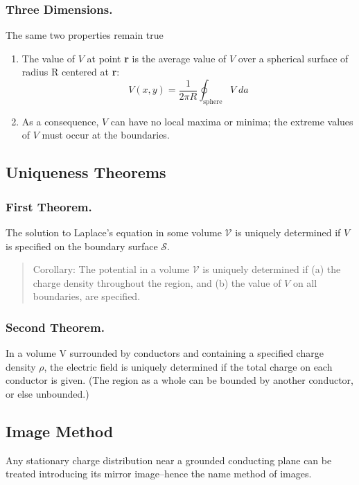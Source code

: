 \documentclass[../../../main.tex]{subfiles}
\begin{document}
\subsubsection{Three Dimensions.} The same two properties remain true
\begin{enumerate}
    \item The value of $V$ at point \textbf{r} is the average value of $V$ over a spherical surface of radius R centered at \textbf{r}:
    \begin{equation*}
        V(x,y)=\frac{1}{2\pi R}\oint_{\text{sphere}}V\;da
    \end{equation*}
    \item As a consequence, $V$ can have no local maxima or minima; the extreme values of $V$ must occur at the boundaries. 
\end{enumerate}

\subsection{Uniqueness Theorems}
\subsubsection{First Theorem.} The solution to Laplace's equation in
    some volume $\mathcal{V}$ is uniquely determined if $V$ is specified on the boundary surface $\mathcal{S}$.

\begin{quote}
    Corollary: The potential in a volume $\mathcal{V}$ is uniquely determined if (a) the charge density throughout the region, and (b) the value of $V$ on all boundaries, are specified.
\end{quote}

\subsubsection{Second Theorem.} In a volume V surrounded by conductors and containing a specified charge density $\rho$, the electric field is uniquely determined if the total charge on each conductor is given. (The region as a whole can be bounded by another conductor, or else unbounded.)

\subsection{Image Method}
Any stationary charge distribution near a grounded conducting plane can be treated introducing its mirror image--hence the name method of images. 
\end{document}
